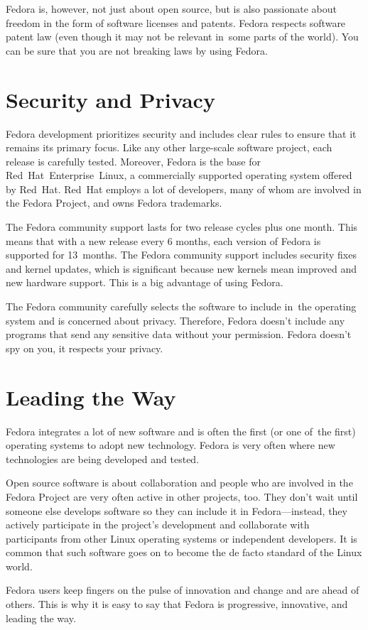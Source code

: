 Fedora is, however, not just about open source, but is also passionate about freedom in the form of software licenses and patents. Fedora respects software patent law (even though it may not be relevant in~some parts of the world). You can be sure that you are not breaking laws by using Fedora.

\section*{Security and Privacy}

Fedora development prioritizes security and includes clear rules to ensure that it remains its primary focus. Like any other large-scale software project, each release is carefully tested. Moreover, Fedora is the base for Red~Hat~Enterprise~Linux, a commercially supported operating system offered by Red~Hat. Red~Hat employs a lot of developers, many of whom are involved in the Fedora Project, and owns Fedora trademarks.

The Fedora community support lasts for two release cycles plus one month. This means that with a new release every 6 months, each version of Fedora is supported for 13~months. The Fedora community support includes security fixes and kernel updates, which is significant because new kernels mean improved and new hardware support. This is a big advantage of using Fedora.

The Fedora community carefully selects the software to include in~the operating system and is concerned about privacy. Therefore, Fedora doesn't include any programs that send any sensitive data without your permission. Fedora doesn't spy on you, it respects your privacy.

\section*{Leading the Way}

Fedora integrates a lot of new software and is often the first (or one of~the first) operating systems to adopt new technology. Fedora is very often where new technologies are being developed and tested.

Open source software is about collaboration and people who are involved in the Fedora Project are very often active in other projects, too. They don't wait until someone else develops software so they can include it in Fedora---instead, they actively participate in the project's development and collaborate with participants from other Linux operating systems or independent developers. It is common that such software goes on to become the de facto standard of the Linux world.

Fedora users keep fingers on the pulse of innovation and change and are ahead of others. This is why it is easy to say that Fedora is progressive, innovative, and leading the way.
\endinput
